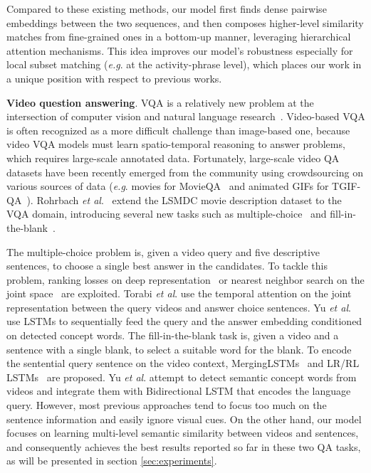 \documentclass[runningheads]{llncs}
\makeatletter
\DeclareRobustCommand\onedot{\futurelet\@let@token\@onedot}
\def\onedot{.\@\xspace}
\def\eg{\textit{e.g}\onedot} \def\Eg{\textit{E.g}\onedot}
\def\etal{\textit{et al}\onedot}
\makeatother
\begin{document}
Compared to these existing methods, our model first finds dense pairwise embeddings between the two sequences, and then composes higher-level similarity matches from fine-grained ones in a bottom-up manner, leveraging hierarchical attention mechanisms. This idea improves our model's robustness especially for local subset matching (\eg at the activity-phrase level), which places our work in a unique position with respect to previous works. 

\textbf{Video question answering}.
VQA is a relatively new problem at the intersection of computer vision and natural language research~\cite{malinowski-nips-2014,antol-iccv-2015,goyal-cvpr-2017}.
Video-based VQA is often recognized as a more difficult challenge than image-based one, because video VQA models must learn spatio-temporal reasoning to answer problems, which requires large-scale annotated data.
Fortunately, large-scale video QA datasets have been recently emerged from the community using crowdsourcing on various sources of data (\eg movies for MovieQA~\cite{tapaswi-cvpr-2016} and animated GIFs for TGIF-QA~\cite{jang-CVPR-2017}). 
Rohrbach \etal~\cite{rohrbach-arxiv-2016} extend the LSMDC movie description dataset to the VQA domain, introducing several new tasks such as multiple-choice~\cite{torabi-arxiv-2016} and fill-in-the-blank~\cite{Tegan-arxiv-2016}. 

The multiple-choice problem is, given a video query and five descriptive sentences, to choose a single best answer in the candidates. 
To tackle this problem, ranking losses on deep representation~\cite{yu-cvpr-2017,jang-CVPR-2017,torabi-arxiv-2016} or nearest neighbor search on the joint space~\cite{kaufman-iccv-2017} are exploited. 
Torabi \etal \cite{torabi-arxiv-2016} use the temporal attention on the joint representation between the query videos and answer choice sentences. 
Yu \etal~\cite{yu-cvpr-2017} use LSTMs to sequentially feed the query and the answer embedding conditioned on detected concept words. 
The fill-in-the-blank task is, given a video and a sentence with a single blank, to select a suitable word for the blank.
To encode the sentential query sentence on the video context, MergingLSTMs~\cite{mazaheri-arxiv-2016} and LR/RL LSTMs~\cite{mazaheri-iccv-2017} are proposed. 
Yu \etal\cite{yu-cvpr-2017,yu-arxiv-2016} attempt to detect semantic concept words from videos and integrate them with Bidirectional LSTM that encodes the language query.
However, most previous approaches tend to focus too much on the sentence information and easily ignore visual cues. 
On the other hand, our model focuses on learning multi-level semantic similarity between videos and sentences, and consequently achieves the best results reported so far in these two QA tasks, as will be presented in section \ref{sec:experiments}.
\end{document}
